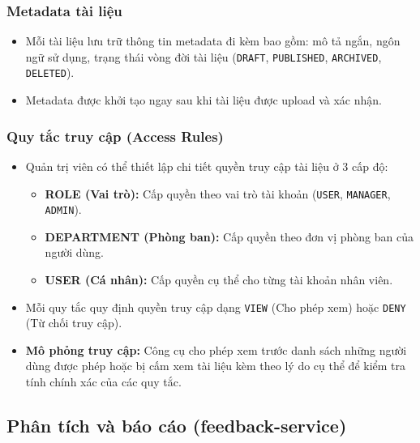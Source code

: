 \documentclass[12pt,a4paper]{report}
\begin{document}
\subsubsection{Metadata tài liệu}
\begin{itemize}
    \item Mỗi tài liệu lưu trữ thông tin metadata đi kèm bao gồm: mô tả ngắn, ngôn ngữ sử dụng, trạng thái vòng đời tài liệu (\texttt{DRAFT}, \texttt{PUBLISHED}, \texttt{ARCHIVED}, \texttt{DELETED}).
    \item Metadata được khởi tạo ngay sau khi tài liệu được upload và xác nhận.
\end{itemize}

\subsubsection{Quy tắc truy cập (Access Rules)}
\begin{itemize}
    \item Quản trị viên có thể thiết lập chi tiết quyền truy cập tài liệu ở 3 cấp độ:
    \begin{itemize}
        \item \textbf{ROLE (Vai trò):} Cấp quyền theo vai trò tài khoản (\texttt{USER}, \texttt{MANAGER}, \texttt{ADMIN}).
        \item \textbf{DEPARTMENT (Phòng ban):} Cấp quyền theo đơn vị phòng ban của người dùng.
        \item \textbf{USER (Cá nhân):} Cấp quyền cụ thể cho từng tài khoản nhân viên.
    \end{itemize}
    \item Mỗi quy tắc quy định quyền truy cập dạng \texttt{VIEW} (Cho phép xem) hoặc \texttt{DENY} (Từ chối truy cập).
    \item \textbf{Mô phỏng truy cập:} Công cụ cho phép xem trước danh sách những người dùng được phép hoặc bị cấm xem tài liệu kèm theo lý do cụ thể để kiểm tra tính chính xác của các quy tắc.
\end{itemize}

\subsection{Phân tích và báo cáo (feedback-service)}
\end{document}
